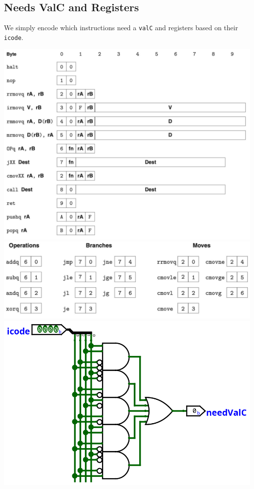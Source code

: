 \documentclass{article}
\begin{document}
\subsection{Needs ValC and Registers}
We simply encode which instructions need a \verb+valC+ and registers based on their \verb+icode+. 
\begin{center}
    \includegraphics[scale=.6]{icode.png} \\
    \includegraphics[scale=.8]{ops.png} 
    \\
    \includegraphics[scale=.7]{needsValC.png}

\end{center}
\end{document}
